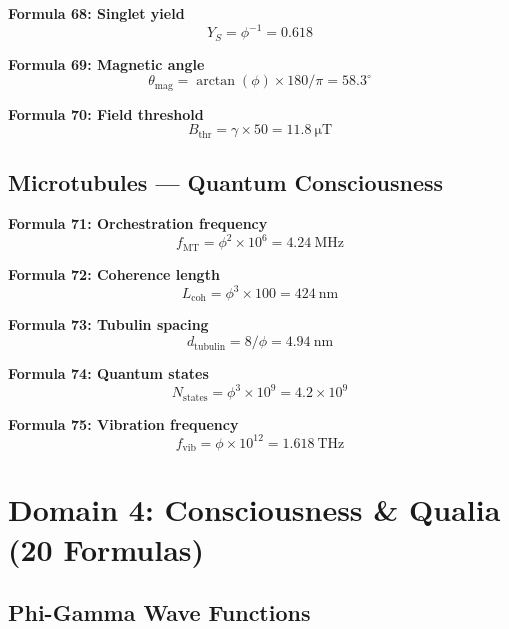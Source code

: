 \documentclass[12pt,a4paper]{article}
\begin{document}
\textbf{Formula 68: Singlet yield}
\begin{equation}
Y_S = \phi^{-1} = 0.618
\end{equation}

\textbf{Formula 69: Magnetic angle}
\begin{equation}
\theta_{\text{mag}} = \arctan(\phi) \times 180/\pi = 58.3^\circ
\end{equation}

\textbf{Formula 70: Field threshold}
\begin{equation}
B_{\text{thr}} = \gamma \times 50 = \SI{11.8}{\micro\tesla}
\end{equation}

\subsection{Microtubules — Quantum Consciousness}

\textbf{Formula 71: Orchestration frequency}
\begin{equation}
f_{\text{MT}} = \phi^2 \times 10^6 = \SI{4.24}{\mega\hertz}
\end{equation}

\textbf{Formula 72: Coherence length}
\begin{equation}
L_{\text{coh}} = \phi^3 \times 100 = \SI{424}{\nano\meter}
\end{equation}

\textbf{Formula 73: Tubulin spacing}
\begin{equation}
d_{\text{tubulin}} = 8/\phi = \SI{4.94}{\nano\meter}
\end{equation}

\textbf{Formula 74: Quantum states}
\begin{equation}
N_{\text{states}} = \phi^3 \times 10^9 = 4.2 \times 10^9
\end{equation}

\textbf{Formula 75: Vibration frequency}
\begin{equation}
f_{\text{vib}} = \phi \times 10^{12} = \SI{1.618}{\tera\hertz}
\end{equation}

\section{Domain 4: Consciousness \& Qualia (20 Formulas)}

\subsection{Phi-Gamma Wave Functions}
\end{document}
